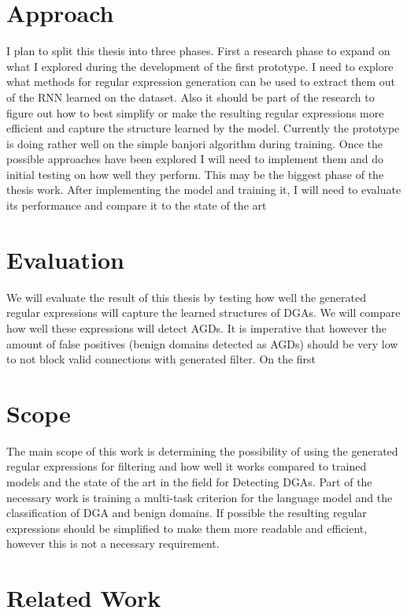 \documentclass[a4paper, 12pt]{article}
\begin{document}
\section{Approach}
I plan to split this thesis into three phases. First a research phase to expand on what I explored
during the development of the first prototype. I need to explore what methods for regular expression
generation can be used to extract them out of the RNN learned on the dataset. Also it should be part
of the research to figure out how to best simplify or make the resulting regular expressions more
efficient and capture the structure learned by the model. Currently the prototype is doing rather
well on the simple banjori algorithm during training. Once the possible approaches have been
explored I will need to implement them and do initial testing on how well they perform.  This may be
the biggest phase of the thesis work. After implementing the model and training it, I will need to
evaluate its performance and compare it to the state of the art \cite{yu_character_2018}
\section{Evaluation}
We will evaluate the result of this thesis by testing how well the generated regular expressions
will capture the learned structures of DGAs. We will compare how well these expressions will detect
AGDs. It is imperative that however the amount of false positives (benign domains detected as AGDs)
should be very low to not block valid connections with generated filter.
On the first

\section{Scope}
The main scope of this work is determining the possibility of using the generated regular
expressions for
filtering and how well it works compared to trained models and the state of the art in the field for
Detecting DGAs. Part of the necessary work is training a multi-task criterion for the language model
and the classification of DGA and benign domains. If possible the resulting regular expressions
should be simplified to make them more readable and efficient, however this is not a necessary
requirement.

\section{Related Work}

\clearpage

\printbibliography
\end{document}
